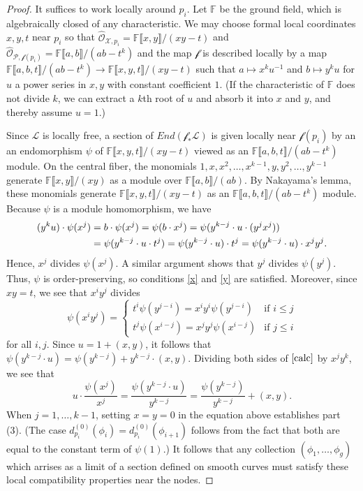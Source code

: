 \documentclass[12pt]{amsart}
\newcommand{\cc}{\mathbb{F}}
\newcommand{\rr}{\mathbb{R}}
\renewcommand{\P}{\mathcal{P}}
\renewcommand{\L}{\mathcal{L}}
\newcommand{\X}{\mathcal{X}}
\renewcommand{\O}{\mathscr{O}}
\newcommand{\f}{\mathcal{f}}
\renewcommand{\ll}{\llbracket}
\renewcommand{\rr}{\rrbracket}
\theoremstyle{definition}
\theoremstyle{remark}
\theoremstyle{remark}
\numberwithin{equation}{section}
\begin{document}
 \begin{proof}
 It suffices to work locally around $p_i$. 
 Let $\cc$ be the ground field, which is algebraically closed of any characteristic.
 We may choose formal local coordinates $x, y, t$ near $p_i$ so that $\widehat{\O}_{\X, p_i} = \cc\ll x, y \rr /(xy - t)$ and $\widehat{\O}_{\P, \f(p_i)} = \cc\ll a, b \rr /(ab - t^k)$ and the map $\f$ is described locally by a map $\cc\ll a, b, t \rr /(ab - t^k) \rightarrow \cc\ll x, y, t \rr/(xy - t)$ such that $a \mapsto x^k u^{-1}$ and $b \mapsto y^k u$ for $u$ a power series in $x, y$ with constant coefficient $1$. (If the characteristic of $\cc$ does not divide $k$, we can extract a $k$th root of $u$ and absorb it into $x$ and $y$, and thereby assume $u  = 1$.)
 
 Since $\L$ is locally free, a section of $End(\f_*\L)$ is given locally near $\f(p_i)$ by an an endomorphism $\psi$ of $\cc\ll x, y, t \rr/(xy - t)$ viewed as an $\cc\ll a, b, t \rr /(ab - t^k) $ module. 
On the central fiber, the monomials $1, x, x^2, \ldots, x^{k-1}, y, y^2, \ldots, y^{k-1}$ generate $\cc\ll x, y \rr/(xy)$ as a module over $\cc\ll a, b \rr /(ab)$. By Nakayama's lemma, these monomials generate $\cc\ll x, y, t \rr/(xy - t)$ as an $\cc \ll a, b, t \rr /(ab - t^k)$ module. Because $\psi$ is a module homomorphism, we have
 \begin{align}
  (y^ku) \cdot \psi(x^j) &= b \cdot \psi(x^j) = \psi(b \cdot x^j) = \psi(y^{k-j} \cdot u \cdot (y^jx^j)) \notag \\
  &= \psi(y^{k-j} \cdot u \cdot t^j) = \psi(y^{k-j} \cdot u) \cdot t^j = \psi(y^{k-j} \cdot u) \cdot x^jy^j. \label{calc}
  \end{align}
Hence, $x^j$ divides $\psi(x^j)$. A similar argument shows that $y^{j}$ divides $\psi(y^{j})$. Thus, $\psi$ is order-preserving, so conditions \eqref{x} and \eqref{y} are satisfied.
Moreover, since $xy = t$, we see that $x^iy^j$ divides 
\[\psi(x^i y^j) = \begin{cases} t^{i} \psi(y^{j -i})  =  x^{i} y^i \psi(y^{j -i}) & \text{if $i \leq j$} \\ t^j \psi(x^{i - j}) =  x^jy^j \psi(x^{i - j}) &\text{if $j \leq i$} \end{cases}\]
for all $i, j$. Since $u = 1 + (x, y)$, it follows that $\psi(y^{k-j} \cdot u) = \psi(y^{k-j}) + y^{k-j} \cdot (x, y)$.
Dividing both sides of $\eqref{calc}$ by $x^j y^{k}$, we see that
 \[u \cdot \frac{\psi(x^j)}{x^j} = \frac{\psi(y^{k-j} \cdot u)}{y^{k-j}} = \frac{\psi(y^{k-j})}{y^{k-j}} + (x, y).\]
When $j = 1 , \ldots, k-1$, setting $x = y = 0$ in the equation above establishes part (3). (The case $d^{(0)}_{p_i}(\phi_i) = d_{p_i}^{(0)}(\phi_{i+1})$ follows from the fact that both are equal to the constant term of $\psi(1)$.)
It follows that any collection $(\phi_1, \ldots, \phi_g)$ which arrises as a limit of a section defined on smooth curves must satisfy these local compatibility properties near the nodes.
   \end{proof}
 
\end{document}
